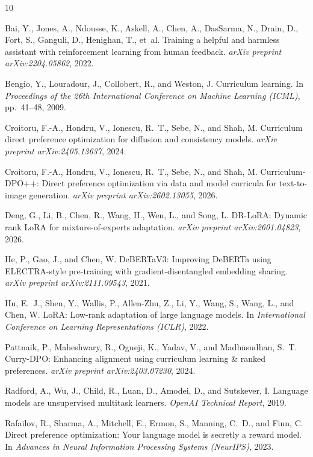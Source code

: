 \documentclass{article}
\begin{document}
\begin{thebibliography}{10}

Bai, Y., Jones, A., Ndousse, K., Askell, A., Chen, A., DasSarma, N., Drain, D., Fort, S., Ganguli, D., Henighan, T., et~al.
\newblock Training a helpful and harmless assistant with reinforcement learning from human feedback.
\newblock \emph{arXiv preprint arXiv:2204.05862}, 2022.

Bengio, Y., Louradour, J., Collobert, R., and Weston, J.
\newblock Curriculum learning.
\newblock In \emph{Proceedings of the 26th International Conference on Machine Learning (ICML)}, pp.~41--48, 2009.

Croitoru, F.-A., Hondru, V., Ionescu, R.~T., Sebe, N., and Shah, M.
\newblock Curriculum direct preference optimization for diffusion and consistency models.
\newblock \emph{arXiv preprint arXiv:2405.13637}, 2024.

Croitoru, F.-A., Hondru, V., Ionescu, R.~T., Sebe, N., and Shah, M.
\newblock Curriculum-DPO++: Direct preference optimization via data and model curricula for text-to-image generation.
\newblock \emph{arXiv preprint arXiv:2602.13055}, 2026.

Deng, G., Li, B., Chen, R., Wang, H., Wen, L., and Song, L.
\newblock DR-LoRA: Dynamic rank LoRA for mixture-of-experts adaptation.
\newblock \emph{arXiv preprint arXiv:2601.04823}, 2026.

He, P., Gao, J., and Chen, W.
\newblock DeBERTaV3: Improving DeBERTa using ELECTRA-style pre-training with gradient-disentangled embedding sharing.
\newblock \emph{arXiv preprint arXiv:2111.09543}, 2021.

Hu, E.~J., Shen, Y., Wallis, P., Allen-Zhu, Z., Li, Y., Wang, S., Wang, L., and Chen, W.
\newblock LoRA: Low-rank adaptation of large language models.
\newblock In \emph{International Conference on Learning Representations (ICLR)}, 2022.

Pattnaik, P., Maheshwary, R., Ogueji, K., Yadav, V., and Madhusudhan, S.~T.
\newblock Curry-DPO: Enhancing alignment using curriculum learning \& ranked preferences.
\newblock \emph{arXiv preprint arXiv:2403.07230}, 2024.

Radford, A., Wu, J., Child, R., Luan, D., Amodei, D., and Sutskever, I.
\newblock Language models are unsupervised multitask learners.
\newblock \emph{OpenAI Technical Report}, 2019.

Rafailov, R., Sharma, A., Mitchell, E., Ermon, S., Manning, C.~D., and Finn, C.
\newblock Direct preference optimization: Your language model is secretly a reward model.
\newblock In \emph{Advances in Neural Information Processing Systems (NeurIPS)}, 2023.

\end{thebibliography}
\end{document}
